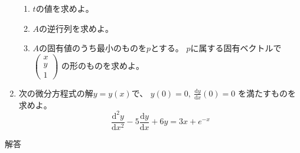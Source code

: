 \documentclass[12pt,b5paper]{ltjsarticle}
\begin{document}
\begin{enumerate}
       \begin{enumerate}
        \item $t$の値を求めよ。
        \item $A$の逆行列を求めよ。
        \item $A$の固有値のうち最小のものを$p$とする。
              $p$に属する固有ベクトルで
              $\begin{pmatrix} x \\ y \\ 1 \end{pmatrix}$
              の形のものを求めよ。
       \end{enumerate}
 \item 次の微分方程式の解$y=y(x)$で、
       $y(0)=0,\ \frac{\mathrm{d}y}{\mathrm{d}x}(0)=0$
       を満たすものを求めよ。
       \begin{equation}
        \frac{\mathrm{d}^2y}{\mathrm{d}x^2}
         -5 \frac{\mathrm{d}y}{\mathrm{d}x}
         + 6y =3x + e^{-x}
       \end{equation}
\end{enumerate}

\hrulefill
解答
\hrulefill
\end{document}

